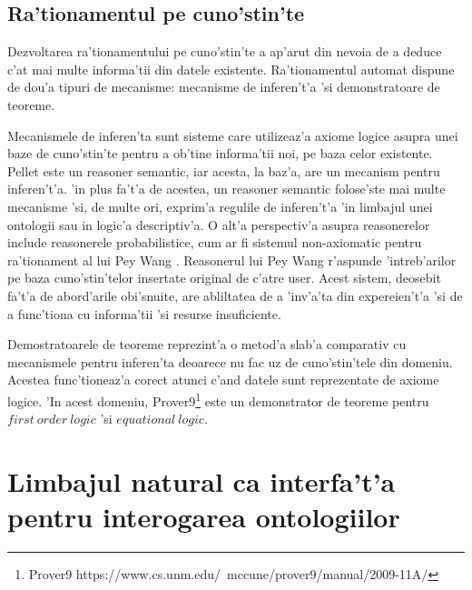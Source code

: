 \documentclass[12pt,a4paper,twoside]{report}
\begin{document}
\subsection{Ra'tionamentul pe cuno'stin'te}

Dezvoltarea ra'tionamentului pe cuno'stin'te a ap'arut din nevoia de a deduce c'at mai multe informa'tii din datele existente. Ra'tionamentul automat dispune de dou'a tipuri de mecanisme: mecanisme de inferen't'a 'si demonstratoare de teoreme. 

Mecanismele de inferen'ta sunt sisteme care utilizeaz'a axiome logice asupra unei baze de cuno'stin'te pentru a ob'tine informa'tii noi, pe baza celor existente. Pellet\cite{SirinPellet:Reasoner} este un reasoner semantic, iar acesta, la baz'a, are un mecanism pentru inferen't'a. 'in plus fa't'a de acestea, un reasoner semantic folose'ste mai multe mecanisme 'si, de multe ori, exprim'a regulile de inferen't'a 'in limbajul unei ontologii sau in logic'a descriptiv'a. O alt'a perspectiv'a asupra reasonerelor include reasonerele probabilistice, cum ar fi sistemul non-axiomatic pentru ra'tionament al lui Pey Wang \cite{nonaxiomaticreasoner}. Reasonerul lui Pey Wang r'aspunde 'intreb'arilor pe baza cuno'stin'telor insertate original de c'atre user. Acest sistem, deosebit fa't'a de abord'arile obi'snuite, are abliltatea de a 'inv'a'ta din expereien't'a 'si de a func'tiona cu informa'tii 'si resurse insuficiente.

Demostratoarele de teoreme reprezint'a o metod'a slab'a comparativ cu mecanismele pentru inferen'ta deoarece nu fac uz de cuno'stin'tele din domeniu. Acestea func'tioneaz'a corect atunci c'and datele sunt reprezentate de axiome logice. 'In acest domeniu, Prover9\footnote{Prover9 https://www.cs.unm.edu/~mccune/prover9/manual/2009-11A/} este un demonstrator de teoreme pentru $first\ order\ logic$ 'si $equational\ logic$.



\section{Limbajul natural ca interfa't'a pentru interogarea ontologiilor}
\end{document}
